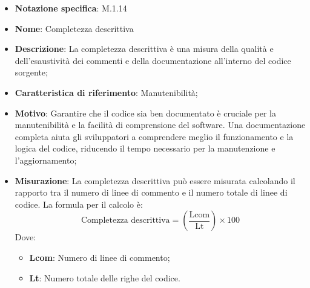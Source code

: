\begin{itemize}
    \item \textbf{Notazione specifica}: M.1.14
    \item \textbf{Nome}: Completezza descrittiva
    \item \textbf{Descrizione}: La completezza descrittiva è una misura della qualità e dell'esaustività dei commenti e della documentazione all'interno del codice sorgente;
    \item \textbf{Caratteristica di riferimento}: Manutenibilità;
    \item \textbf{Motivo}: Garantire che il codice sia ben documentato è cruciale per la manutenibilità e la facilità di comprensione del software. Una documentazione completa aiuta gli sviluppatori a comprendere meglio il funzionamento e la logica del codice, riducendo il tempo necessario per la manutenzione e l'aggiornamento;
    \item \textbf{Misurazione}: La completezza descrittiva può essere misurata calcolando il rapporto tra il numero di linee di commento e il numero totale di linee di codice. La formula per il calcolo è:
    \begin{equation}
    \text{Completezza descrittiva} = \left( \frac{\text{Lcom}}{\text{Lt}} \right) \times 100
    \end{equation}
    Dove:
    \begin{itemize}
        \item \textbf{Lcom}: Numero di linee di commento;
        \item \textbf{Lt}: Numero totale delle righe del codice.
    \end{itemize}
\end{itemize}
